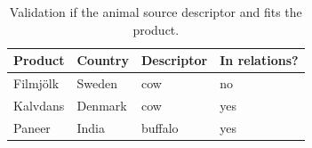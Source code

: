 \documentclass[sigconf]{acmart-txmm}
\begin{document}
\begin{table}[h]
  \centering
  \caption{Validation if the animal source descriptor and fits the product.}
  \label{tab:val_animal2}
  \begin{tabular}{llll}
    \toprule
    \textbf{Product} & \textbf{Country} & \textbf{Descriptor} & \textbf{In relations?} \\
    \midrule
    Filmjölk & Sweden & cow & no \\
    Kalvdans & Denmark & cow & yes \\
    Paneer & India & buffalo & yes \\
    \bottomrule
  \end{tabular}
\end{table}
\end{document}
